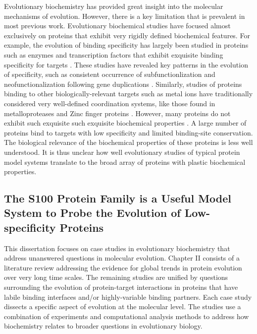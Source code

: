 Evolutionary biochemistry has provided great insight into the molecular
mechanisms of evolution. However, there is a key limitation that is
prevalent in most previous work. Evolutionary biochemical studies
have focused almost exclusively on proteins that exhibit very rigidly
defined biochemical features. For example, the evolution of binding
specificity has largely been studied in proteins such as enzymes and
transcription factors that exhibit exquisite binding specificity for
targets \citep{zarrinpar_optimization_2003,weinreich_darwinian_2006,copley_toward_2012,reinke_networks_2013}.
These studies have revealed key patterns in the evolution of specificity,
such as consistent occurrence of subfunctionlization and neofunctionalization
following gene duplications \citep{boucher_atomic-resolution_2014,eick_evolution_2012,mckeown_evolution_2014,hudson_structure_2014,howard_ancestral_2014}.
Similarly, studies of proteins binding to other biologically-relevant
targets such as metal ions have traditionally considered very well-defined
coordination systems, like those found in metalloproteases and Zinc
finger proteins \citep{yannone_metals_2012}. However, many proteins
do not exhibit such exquisite such exquisite biochemical properties
\citep{ekman_what_2006,uchikoga_specificity_2016,bhattacharya_target_2004,chin_calmodulin:_2000,mitchell_evolutionary_2013,gfeller_multiple-specificity_2014,schreiber_protein_2011,copley_evolutionary_2015}.
A large number of proteins bind to targets with low specificity and
limited binding-site conservation. The biological relevance of the
biochemical properties of these proteins is less well understood.
It is thus unclear how well evolutionary studies of typical protein
model systems translate to the broad array of proteins with plastic
biochemical properties. 

\subsection{The S100 Protein Family is a Useful Model System to Probe the Evolution
of Low-specificity Proteins}

This dissertation focuses on case studies in evolutionary biochemistry
that address unanswered questions in molecular evolution. Chapter
II consists of a literature review addressing the evidence for global
trends in protein evolution over very long time scales. The remaining
studies are unified by questions surrounding the evolution of protein-target
interactions in proteins that have labile binding interfaces and/or
highly-variable binding partners. Each case study dissects a specific
aspect of evolution at the molecular level. The studies use a combination
of experiments and computational analysis methods to address how biochemistry
relates to broader questions in evolutionary biology. 

